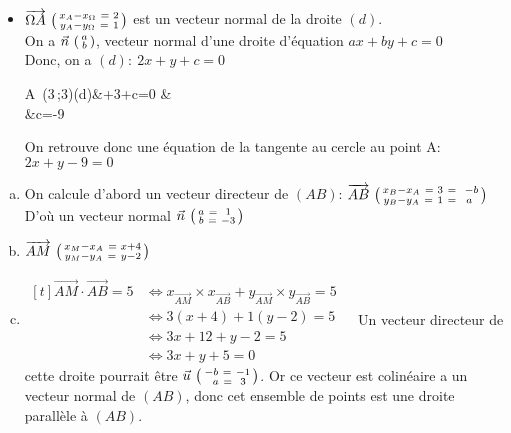 \documentclass[12pt, a4paper]{article}
\begin{document}
	\begin{Exercise}[number={60}]
		\begin{itemize}
			\item[] $\overrightarrow{\Omega A}\ \begin{psmallmatrix}x_A-x_\Omega\ =& 2 \\ y_A-y_\Omega\ =& 1\end{psmallmatrix}$ est un vecteur normal de la droite $(d)$. \\ On a $\vec{n}\ \begin{psmallmatrix}a \\ b\end{psmallmatrix}$, vecteur normal d'une droite d'équation $ax+by+c=0$ \\ 
				Donc, on a $(d):\ 2x+y+c=0$
				\begin{flalign*}
					A\ (3\,;3)\in(d)&+3+c=0 &\\
					&\iff c=-9
				\end{flalign*}
				On retrouve donc une équation de la tangente au cercle au point A: $2x+y-9=0$
		\end{itemize}
	\end{Exercise}

	\begin{Exercise}[number={61}]
		\begin{enumerate}[a)]
			\item	On calcule d'abord un vecteur directeur de $(AB)$: $\overrightarrow{AB}\ \begin{psmallmatrix}x_B-x_A\ =& 3\ =&\ -b \\ y_B-y_A\ =& 1\ =& a\end{psmallmatrix}$ \\ D'où un vecteur normal $\vec{n}\ \begin{psmallmatrix}a\ =& 1 \\ b\ =& -3\end{psmallmatrix}$
			\item 	$\overrightarrow{AM}\ \begin{psmallmatrix}x_M-x_A\ =& x+4 \\ y_M-y_A\ =& y-2\end{psmallmatrix}$
			\item 	$\begin{aligned}[t]
						\overrightarrow{AM}\cdot\overrightarrow{AB}=5&\iff x_{\overrightarrow{AM}}\times x_{\overrightarrow{AB}}+y_{\overrightarrow{AM}}\times y_{\overrightarrow{AB}}=5 &\\
						&\iff 3(x+4)+1(y-2)=5 &\\
						&\iff 3x+12+y-2=5 &\\
						&\iff 3x+y+5=0
					\end{aligned}$ \medbreak Un vecteur directeur de cette droite pourrait être $\vec{u}\ \begin{psmallmatrix}-b\ =& -1 \\ \hphantom{-}a\ =& 3\end{psmallmatrix}$. Or ce vecteur est colinéaire a un vecteur normal de $(AB)$, donc cet ensemble de points est une droite parallèle à $(AB)$.
		\end{enumerate}
	\end{Exercise}
\end{document}
